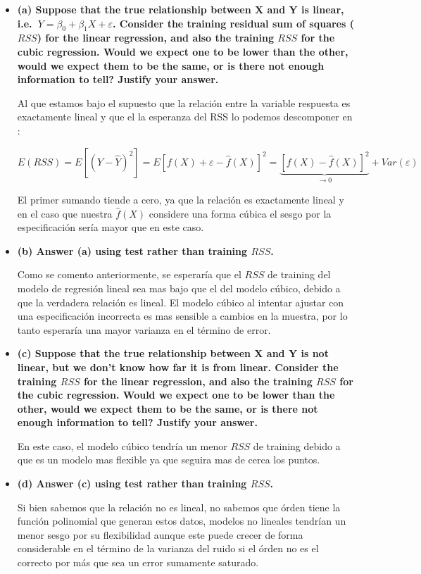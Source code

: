 \documentclass[
]{book}
\begin{document}
\begin{itemize}
\item
  \textbf{(a) Suppose that the true relationship between X and Y is
  linear, i.e.~\(Y = \beta_{0} + \beta_{1}X + \varepsilon\). Consider
  the training residual sum of squares (\(RSS\)) for the linear
  regression, and also the training \(RSS\) for the cubic regression.
  Would we expect one to be lower than the other, would we expect them
  to be the same, or is there not enough information to tell? Justify
  your answer.}

  Al que estamos bajo el supuesto que la relación entre la variable
  respuesta es exactamente lineal y que el la esperanza del RSS lo
  podemos descomponer en :

  \begin{equation*}
        E(RSS) = E\left[\left(Y - \hat{Y}\right)^{2}\right] = E\left[f(X) + \varepsilon - \hat{f}(X)\right]^{2} = \underbrace{\left[f(X) - \hat{f}(X)\right]^{2}}_{\longrightarrow 0} + Var(\varepsilon)
    \end{equation*}

  El primer sumando tiende a cero, ya que la relación es exactamente
  lineal y en el caso que nuestra \(\hat{f}(X)\) considere una forma
  cúbica el sesgo por la especificación sería mayor que en este caso.
\item
  \textbf{(b) Answer (a) using test rather than training \(RSS\).}

  Como se comento anteriormente, se esperaría que el \(RSS\) de training
  del modelo de regresión lineal sea mas bajo que el del modelo cúbico,
  debido a que la verdadera relación es lineal. El modelo cúbico al
  intentar ajustar con una especificación incorrecta es mas sensible a
  cambios en la muestra, por lo tanto esperaría una mayor varianza en el
  término de error.
\item
  \textbf{(c) Suppose that the true relationship between X and Y is not
  linear, but we don't know how far it is from linear. Consider the
  training \(RSS\) for the linear regression, and also the training
  \(RSS\) for the cubic regression. Would we expect one to be lower than
  the other, would we expect them to be the same, or is there not enough
  information to tell? Justify your answer.}

  En este caso, el modelo cúbico tendría un menor \(RSS\) de training
  debido a que es un modelo mas flexible ya que seguira mas de cerca los
  puntos.
\item
  \textbf{(d) Answer (c) using test rather than training \(RSS\).}

  Si bien sabemos que la relación no es lineal, no sabemos que órden
  tiene la función polinomial que generan estos datos, modelos no
  lineales tendrían un menor sesgo por su flexibilidad aunque este puede
  crecer de forma considerable en el término de la varianza del ruido si
  el órden no es el correcto por más que sea un error sumamente
  saturado.
\end{itemize}
\end{document}
